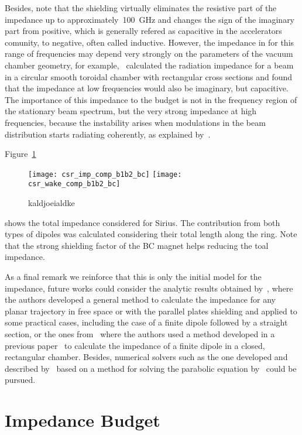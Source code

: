     Besides, note that the shielding virtually eliminates the resistive part of the impedance up to approximately~\SI{100}{\giga\hertz} and changes the sign of the imaginary part from positive, which is generally refered as capacitive in the accelerators comunity, to negative, often called inductive. However, the impedance in for this range of frequencies may depend very strongly on the parameters of the vacuum chamber geometry, for example,~ calculated the radiation impedance for a beam in a circular smooth toroidal chamber with rectangular cross sections and found that the impedance at low frequencies would also be imaginary, but capacitive. The importance of this impedance to the budget is not in the frequency region of the stationary beam spectrum, but the very strong impedance at high frequencies, because the instability arises when modulations in the beam distribution starts radiating coherently, as explained by~.

    Figure~\ref{fig:csr_total_impedance}
    \begin{figure}[t]
        \centering
        \texttt{[image: csr\_imp\_comp\_b1b2\_bc]}\hfill
        \texttt{[image: csr\_wake\_comp\_b1b2\_bc]}
        \caption{kaldjoeialdke}
        \label{fig:csr_total_impedance}
    \end{figure}
    shows the total impedance considered for Sirius. The contribution from both types of dipoles was calculated considering their total length along the ring. Note that the strong shielding factor of the BC magnet helps reducing the toal impedance.

    As a final remark we reinforce that this is only the initial model for the impedance, future works could consider the analytic results obtained by~, where the authors developed a general method to calculate the impedance for any planar trajectory in free space or with the parallel plates shielding and applied to some practical cases, including the case of a finite dipole followed by a straight section, or the ones from~ where the authors used a method developed in a previous paper~\cite{Stupakov2003} to calculate the impedance of a finite dipole in a closed, rectangular chamber. Besides, numerical solvers such as the one developed and described by~ based on a method for solving the parabolic equation by~ could be pursued.

\chapter{Impedance Budget}
